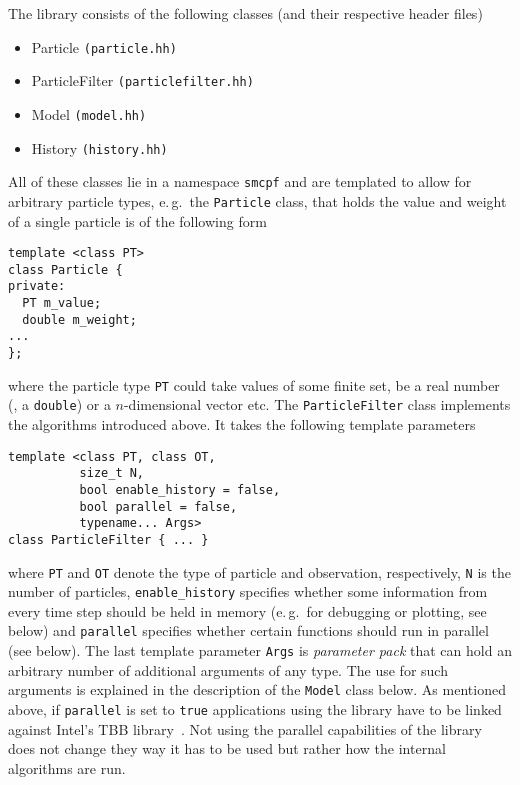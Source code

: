 The library consists of the following classes (and their respective
header files)
\begin{itemize}
\item Particle \texttt{(particle.hh)}
\item ParticleFilter \texttt{(particlefilter.hh)}
\item Model \texttt{(model.hh)}
\item History \texttt{(history.hh)}
\end{itemize}
All of these classes lie in a namespace \texttt{smcpf} and are
templated to allow for arbitrary particle types, e.\,g.\ the
\texttt{Particle} class, that holds the value and weight of a single
particle is of the following form
\begin{verbatim}
template <class PT> 
class Particle {
private:
  PT m_value;
  double m_weight;
...
}; 
\end{verbatim}
where the particle type \texttt{PT} could take values of some finite
set, be a real number (\ie, a \texttt{double}) or a $n$-dimensional
vector etc. The \texttt{ParticleFilter} class implements the
algorithms introduced above. It takes the following template
parameters
\begin{verbatim}
template <class PT, class OT, 
          size_t N, 
          bool enable_history = false,
          bool parallel = false, 
          typename... Args>
class ParticleFilter { ... }

\end{verbatim}
where \texttt{PT} and \texttt{OT} denote the type of particle and
observation, respectively, \texttt{N} is the number of particles,
\texttt{enable\_history} specifies whether some information from every
time step should be held in memory (e.\,g.\ for debugging or plotting,
see below) and \texttt{parallel} specifies whether certain functions
should run in parallel (see below). The last template parameter
\texttt{Args} is \emph{parameter pack} that can hold an arbitrary
number of additional arguments of any type. The use for such arguments
is explained in the description of the \texttt{Model} class below.  As
mentioned above, if \texttt{parallel} is set to \texttt{true}
applications using the library have to be linked against Intel's TBB
library~\cite{intel}. Not using the parallel capabilities of the
library does not change they way it has to be used but rather how the
internal algorithms are run.


